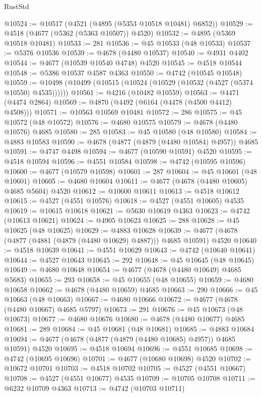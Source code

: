 \begin{lexlean}{RustStd}
\begin{coremodule}
@10524 := @10517 (@4521 (@4895 (@5353 @10518 @10481) @6852))
@10529 := @4518 (@4677 (@5362 (@5363 @10507)) @4520)
@10532 := @4895 (@5369 @10518 @10481)
@10533 := 281
@10536 := @45 @10533 (@48 @10533)
@10537 := @5376 @10536
@10539 := @4678 (@4480 @10537)
@10540 := @4931 @4402
@10544 := @4677 (@10539 @10540 @4748) @4520
@10545 := @4518 @10544
@10548 := @5386 @10537 @4587 @4363
@10550 := @4742 (@10545 @10548)
@10559 := @10498 (@10499 (@10515 (@10524 (@10529 (@10532 (@4527 (@5374 @10550) @4535))))))
@10561 := @4216 (@10482 @10559)
@10563 := @4471 (@4474 @2864)
@10569 := @4870 (@4492 (@6164 (@4478 (@4500 @4412) @4508)))
@10571 := @10563 @10569 @10481
@10572 := 286
@10575 := @45 @10572 (@48 @10572)
@10576 := @4680 @10575
@10579 := @4678 (@4480 @10576) @4685
@10580 := 285
@10583 := @45 @10580 (@48 @10580)
@10584 := @4883 @10583
@10590 := @4678 (@4877 (@4879 (@4480 @10584) @4957)) @4685
@10591 := @4747 @4498
@10594 := @4677 (@10590 @10591) @4520
@10595 := @4518 @10594
@10596 := @4551 @10584
@10598 := @4742 (@10595 @10596)
@10600 := @4677 (@10579 @10598)
@10601 := 287
@10604 := @45 @10601 (@48 @10601)
@10605 := @4680 @10604
@10611 := @4677 (@4678 (@4480 @10605) @4685 @5604) @4520
@10612 := @10600 @10611
@10613 := @4518 @10612
@10615 := @4527 (@4551 @10576)
@10618 := @4527 (@4551 @10605) @4535
@10619 := @10615 @10618
@10621 := @5630 @10619 @4363
@10623 := @4742 (@10613 @10621)
@10624 := @4905 @10623
@10625 := 288
@10628 := @45 @10625 (@48 @10625)
@10629 := @4883 @10628
@10639 := @4677 (@4678 (@4877 (@4881 (@4879 (@4480 @10629) @4887))) @4685 @10591) @4520
@10640 := @4518 @10639
@10641 := @4551 @10629
@10643 := @4742 (@10640 @10641)
@10644 := @4527 @10643
@10645 := 292
@10648 := @45 @10645 (@48 @10645)
@10649 := @4680 @10648
@10654 := @4677 (@4678 (@4480 @10649) @4685 @5683)
@10655 := 293
@10658 := @45 @10655 (@48 @10655)
@10659 := @4680 @10658
@10662 := @4678 (@4480 @10659) @4685
@10663 := 290
@10666 := @45 @10663 (@48 @10663)
@10667 := @4680 @10666
@10672 := @4677 (@4678 (@4480 @10667) @4685 @5797)
@10673 := 291
@10676 := @45 @10673 (@48 @10673)
@10677 := @4680 @10676
@10680 := @4678 (@4480 @10677) @4685
@10681 := 289
@10684 := @45 @10681 (@48 @10681)
@10685 := @4883 @10684
@10694 := @4677 (@4678 (@4877 (@4879 (@4480 @10685) @4957)) @4685 @10591) @4520
@10695 := @4518 @10694
@10696 := @4551 @10685
@10698 := @4742 (@10695 @10696)
@10701 := @4677 (@10680 @10698) @4520
@10702 := @10672 @10701
@10703 := @4518 @10702
@10705 := @4527 (@4551 @10667)
@10708 := @4527 (@4551 @10677) @4535
@10709 := @10705 @10708
@10711 := @6232 @10709 @4363
@10713 := @4742 (@10703 @10711)

\end{coremodule}
\end{lexlean}
